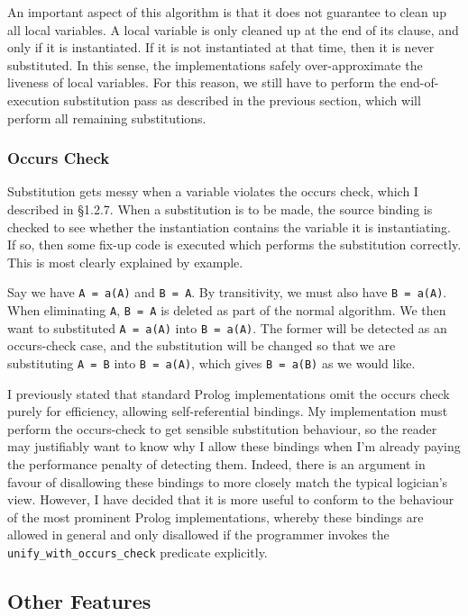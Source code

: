 \documentclass[12pt]{article}
\begin{document}
An important aspect of this algorithm is that it does not guarantee to clean up all local variables.
A local variable is only cleaned up at the end of its clause, and only if it is instantiated.
If it is not instantiated at that time, then it is never substituted.
In this sense, the implementations safely over-approximate the liveness of local variables.
For this reason, we still have to perform the end-of-execution substitution pass as described in the previous section, which will perform all remaining substitutions.

\subsubsection{Occurs Check}

Substitution gets messy when a variable violates the occurs check, which I described in \S1.2.7. 
When a substitution is to be made, the source binding is checked to see whether the instantiation contains the variable it is instantiating. 
If so, then some fix-up code is executed which performs the substitution correctly. 
This is most clearly explained by example.

Say we have \verb|A = a(A)| and \verb|B = A|. By transitivity, we must also have \verb|B = a(A)|. 
When eliminating \verb|A|, \verb|B = A| is deleted as part of the normal algorithm. 
We then want to substituted \verb|A = a(A)| into \verb|B = a(A)|. 
The former will be detected as an occurs-check case, and the substitution will be changed so that we are substituting \verb|A = B| into \verb|B = a(A)|, which gives \verb|B = a(B)| as we would like.

I previously stated that standard Prolog implementations omit the occurs check purely for efficiency, allowing self-referential bindings.
My implementation must perform the occurs-check to get sensible substitution behaviour, so the reader may justifiably want to know why I allow these bindings when I'm already paying the performance penalty of detecting them. 
Indeed, there is an argument in favour of disallowing these bindings to more closely match the typical logician's view. 
However, I have decided that it is more useful to conform to the behaviour of the most prominent Prolog implementations, whereby these bindings are allowed in general and only disallowed if the programmer invokes the \verb|unify_with_occurs_check| predicate explicitly. 

\subsection{Other Features}
\end{document}
